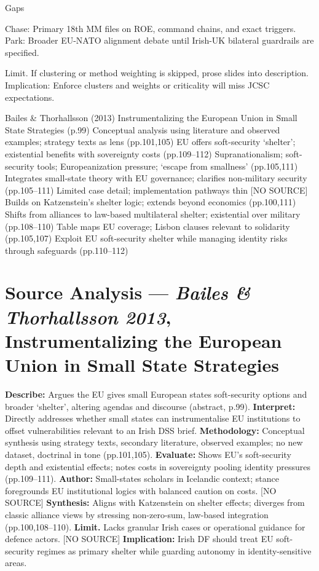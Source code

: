 Gaps

Chase: Primary 18th MM files on ROE, command chains, and exact triggers.
Park: Broader EU-NATO alignment debate until Irish-UK bilateral guardrails are specified.

Limit. If clustering or method weighting is skipped, prose slides into description.
Implication: Enforce clusters and weights or criticality will miss JCSC expectations.


\parencite{BAILES_2012}




Bailes \& Thorhallsson (2013)	Instrumentalizing the European Union in Small State Strategies (p.99)	Conceptual analysis using literature and observed examples; strategy texts as lens (pp.101,105)	EU offers soft-security ‘shelter’; existential benefits with sovereignty costs (pp.109–112)	Supranationalism; soft-security tools; Europeanization pressure; ‘escape from smallness’ (pp.105,111)	Integrates small-state theory with EU governance; clarifies non-military security (pp.105–111)	Limited case detail; implementation pathways thin [NO SOURCE]	Builds on Katzenstein’s shelter logic; extends beyond economics (pp.100,111)	Shifts from alliances to law-based multilateral shelter; existential over military (pp.108–110)	Table maps EU coverage; Lisbon clauses relevant to solidarity (pp.105,107)	Exploit EU soft-security shelter while managing identity risks through safeguards (pp.110–112)


\section*{Source Analysis — \textit{Bailes \& Thorhallsson 2013}, Instrumentalizing the European Union in Small State Strategies}
\textbf{Describe:} Argues the EU gives small European states soft-security options and broader ‘shelter’, altering agendas and discourse (abstract, p.99). 
\textbf{Interpret:} Directly addresses whether small states can instrumentalise EU institutions to offset vulnerabilities relevant to an Irish DSS brief. 
\textbf{Methodology:} Conceptual synthesis using strategy texts, secondary literature, observed examples; no new dataset, doctrinal in tone (pp.101,105). 
\textbf{Evaluate:} Shows EU’s soft-security depth and existential effects; notes costs in sovereignty pooling identity pressures (pp.109–111).  
\textbf{Author:} Small-states scholars in Icelandic context; stance foregrounds EU institutional logics with balanced caution on costs. [NO SOURCE]
\textbf{Synthesis:} Aligns with Katzenstein on shelter effects; diverges from classic alliance views by stressing non-zero-sum, law-based integration (pp.100,108–110).  
\textbf{Limit.} Lacks granular Irish cases or operational guidance for defence actors. [NO SOURCE]
\textbf{Implication:} Irish DF should treat EU soft-security regimes as primary shelter while guarding autonomy in identity-sensitive areas.

